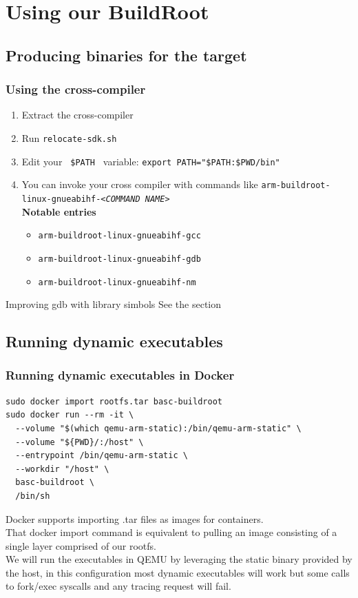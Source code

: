 \section{Using our BuildRoot}
\subsection{Producing binaries for the target}
\begin{frame}
  \frametitle{Using the cross-compiler}
  \begin{enumerate}
    \item Extract the cross-compiler
    \item Run \texttt{relocate-sdk.sh}
    \item Edit your \texttt{ \$PATH } variable: \texttt{export PATH="\${PATH}:\${PWD}/bin"}
    \item You can invoke your cross compiler with commands like \texttt{arm-buildroot-linux-gnueabihf-\textit{<COMMAND NAME>}} \\
    \textbf{Notable entries}
    \begin{itemize}
      \item \texttt{arm-buildroot-linux-gnueabihf-gcc}
      \item \texttt{arm-buildroot-linux-gnueabihf-gdb}
      \item \texttt{arm-buildroot-linux-gnueabihf-nm}
    \end{itemize}
  \end{enumerate}
  \begin{alertblock}{Improving gdb with library simbols}
    See the section \hyperlink{important}{}
  \end{alertblock}
\end{frame}

\subsection{Running dynamic executables}
\begin{frame}[fragile]
  \frametitle{Running dynamic executables in Docker}
  \begin{verbatim}
sudo docker import rootfs.tar basc-buildroot
sudo docker run --rm -it \
  --volume "$(which qemu-arm-static):/bin/qemu-arm-static" \
  --volume "${PWD}/:/host" \
  --entrypoint /bin/qemu-arm-static \
  --workdir "/host" \
  basc-buildroot \
  /bin/sh
  \end{verbatim}
\end{frame}
\only<handout> {
  Docker supports importing .tar files as images for containers. \\
  That docker import command is equivalent to pulling an image consisting of a single layer comprised of our rootfs. \\
  We will run the executables in QEMU by leveraging the static binary provided by the host, in this configuration
  most dynamic executables will work but some calls to fork/exec syscalls and any tracing request will fail.
}

